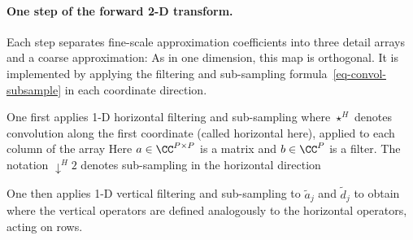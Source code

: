 
\paragraph{One step of the forward 2-D transform.}

Each step separates fine-scale approximation coefficients into three detail arrays and a coarse approximation:
As in one dimension, this map is orthogonal. It is implemented by applying the filtering and sub-sampling formula~\eqref{eq-convol-subsample} in each coordinate direction.

One first applies 1-D horizontal filtering and sub-sampling
where $\star^H$ denotes convolution along the first coordinate (called horizontal here), applied to each column of the array
Here $a\in\CC^{P\times P}$ is a matrix and $b\in\CC^P$ is a filter. The notation $\downarrow^H 2$ denotes sub-sampling in the horizontal direction

One then applies 1-D vertical filtering and sub-sampling to $\tilde a_j$ and $\tilde d_j$ to obtain
where the vertical operators are defined analogously to the horizontal operators, acting on rows.


